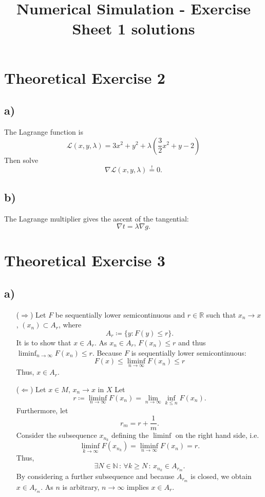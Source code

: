 \documentclass[a4paper]{amsart}
\newcommand{\R}{\ensuremath{\mathbb{R}}}
\newcommand{\N}{\ensuremath{\mathbb{N}}}
\begin{document}
\title{Numerical Simulation - Exercise Sheet 1 solutions}
\maketitle{}
\section*{Theoretical Exercise 2}
\subsection*{a)}
The Lagrange function is
\[
	\mathcal{L}(x, y, \lambda) = 3x^2 + y^2 + \lambda \left(\frac{3}{2} x^2 + y - 2\right)
\]
Then solve
\[
	\nabla \mathcal{L}(x, y, \lambda) \overset{!}{=} 0.
\]
\subsection*{b)}
The Lagrange multiplier gives the ascent of the tangential:
\[
	\nabla t = \lambda \nabla g.
\]
\section*{Theoretical Exercise 3}
\subsection*{a)}
\begin{itemize}
\item[($\Rightarrow$)] Let $F$ be sequentially lower semicontinuous and $r \in \R$ such that $x_n \to x$, $(x_n) \subset A_r$, where
\[
	A_r \coloneqq \{ y : F(y) \leq r \}.
\]
It is to show that $x \in A_r$.
As $x_n \in A_r$, $F(x_n) \leq r$ and thus $\liminf_{n \to \infty} F(x_n) \leq r$.
Because $F$ is sequentially lower semicontinuous:
\[
	F(x) \leq \liminf_{n \to \infty} F(x_n) \leq r
\]
Thus, $x \in A_r$.
\item[($\Leftarrow$)] Let $x \in M$, $x_n \to x$ in $X$
Let
\[
	r \coloneqq \liminf_{n \to \infty} F(x_n) = \lim_{n \to \infty} \inf_{k \leq n} F(x_n).
\]
Furthermore, let
\[
	r_m = r + \frac{1}{m}.
\]
Consider the subsequence $x_{n_k}$ defining the $\liminf$ on the right hand side, i.e.
\[
	\liminf_{k \to \infty} F(x_{n_k}) = \liminf_{n \to \infty} F(x_n) = r.
\]
Thus,
\[
	\exists N \in \N \, : \, \forall k \geq N \, : \, x_{n_k} \in A_{r_m}.
\]
By considering a further subsequence and because $A_{r_m}$ is closed, we obtain $x \in A_{r_m}$.
As $n$ is arbitrary, $n \to \infty$ implies $x \in A_r$.
\end{itemize}
\end{document}

